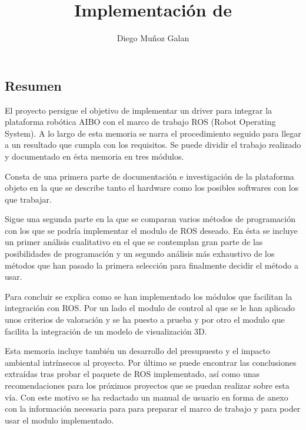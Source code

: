 \documentclass[12pt,a4paper,final,twoside]{book}
\title{Implementación de }
\author{Diego Muñoz Galan}
\begin{document}
\maketitle
\thispagestyle{empty}

\newpage
\paragraph{}
\thispagestyle{empty}
\cleardoublepage

\setcounter{page}{1}
\begin{center}
\chapter*{Resumen}
\end{center}
\thispagestyle{fancy}
El proyecto persigue el objetivo de implementar un driver para integrar la plataforma robótica AIBO con el marco de trabajo ROS (Robot Operating System). A lo largo de esta memoria se narra el procedimiento seguido para llegar a un resultado que cumpla con los requisitos. 
Se puede dividir el trabajo realizado y documentado en ésta memoria en tres módulos.

Consta de una primera parte de documentación e investigación de la plataforma objeto en la que se describe tanto el hardware como los posibles softwares con los que trabajar.

Sigue una segunda parte en la que se comparan varios métodos de programación con los que se podría implementar el modulo de ROS deseado. En ésta se incluye un primer análisis cualitativo en el que se contemplan gran parte de las posibilidades de programación y un segundo análisis más exhaustivo de los métodos que han pasado la primera selección para finalmente decidir el método a usar.

Para concluir se explica como se han implementado los módulos que facilitan la integración con ROS. Por un lado el modulo de control al que se le han aplicado unos criterios de valoración y se ha puesto a prueba y por otro el modulo que facilita la integración de un modelo de visualización 3D.

Esta memoria incluye también un desarrollo del presupuesto y el impacto ambiental intrínsecos al proyecto. Por último se puede encontrar las conclusiones extraídas tras probar el paquete de ROS implementado, así como unas recomendaciones para los próximos proyectos que se puedan realizar sobre esta vía.
Con este motivo se ha redactado un manual de usuario en forma de anexo con la información necesaria para para preparar el marco de trabajo y para poder usar el modulo implementado.
\end{document}
